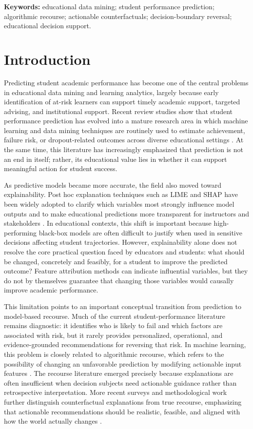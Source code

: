 \documentclass[11pt]{article}
\begin{document}
\noindent\textbf{Keywords:} educational data mining; student performance prediction; algorithmic recourse; actionable counterfactuals; decision-boundary reversal; educational decision support.

\section{Introduction}

Predicting student academic performance has become one of the central problems in educational data mining and learning analytics, largely because early identification of at-risk learners can support timely academic support, targeted advising, and institutional support. Recent review studies show that student performance prediction has evolved into a mature research area in which machine learning and data mining techniques are routinely used to estimate achievement, failure risk, or dropout-related outcomes across diverse educational settings \cite{Albreiki2021,Zhang2021}. At the same time, this literature has increasingly emphasized that prediction is not an end in itself; rather, its educational value lies in whether it can support meaningful action for student success.

As predictive models became more accurate, the field also moved toward explainability. Post hoc explanation techniques such as LIME and SHAP have been widely adopted to clarify which variables most strongly influence model outputs and to make educational predictions more transparent for instructors and stakeholders \cite{Ribeiro2016,Lundberg2017}. In educational contexts, this shift is important because high-performing black-box models are often difficult to justify when used in sensitive decisions affecting student trajectories. However, explainability alone does not resolve the core practical question faced by educators and students: what should be changed, concretely and feasibly, for a student to improve the predicted outcome? Feature attribution methods can indicate influential variables, but they do not by themselves guarantee that changing those variables would causally improve academic performance.

This limitation points to an important conceptual transition from prediction to model-based recourse. Much of the current student-performance literature remains diagnostic: it identifies who is likely to fail and which factors are associated with risk, but it rarely provides personalized, operational, and evidence-grounded recommendations for reversing that risk. In machine learning, this problem is closely related to algorithmic recourse, which refers to the possibility of changing an unfavorable prediction by modifying actionable input features \cite{Ustun2019}. The recourse literature emerged precisely because explanations are often insufficient when decision subjects need actionable guidance rather than retrospective interpretation. More recent surveys and methodological work further distinguish counterfactual explanations from true recourse, emphasizing that actionable recommendations should be realistic, feasible, and aligned with how the world actually changes \cite{Karimi2021,Karimi2022,Verma2024}.
\end{document}
